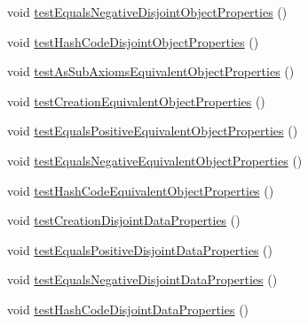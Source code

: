 \begin{DoxyCompactItemize}
\item 
void \hyperlink{classorg_1_1semanticweb_1_1owlapi_1_1datafactory_1_1_o_w_l_data_factory_test_case_a8ba5b1972c721eb5800044b9acf6571a}{test\-Equals\-Negative\-Disjoint\-Object\-Properties} ()
\item 
void \hyperlink{classorg_1_1semanticweb_1_1owlapi_1_1datafactory_1_1_o_w_l_data_factory_test_case_a06f31324ea275c5fe3e97009cce9a9cc}{test\-Hash\-Code\-Disjoint\-Object\-Properties} ()
\item 
void \hyperlink{classorg_1_1semanticweb_1_1owlapi_1_1datafactory_1_1_o_w_l_data_factory_test_case_a3056afa30078644d4db5946d3c4c0cec}{test\-As\-Sub\-Axioms\-Equivalent\-Object\-Properties} ()
\item 
void \hyperlink{classorg_1_1semanticweb_1_1owlapi_1_1datafactory_1_1_o_w_l_data_factory_test_case_a061719b16a6df5a9248bd13da0a093f7}{test\-Creation\-Equivalent\-Object\-Properties} ()
\item 
void \hyperlink{classorg_1_1semanticweb_1_1owlapi_1_1datafactory_1_1_o_w_l_data_factory_test_case_afefba4617e0468ae159b24303c60f43a}{test\-Equals\-Positive\-Equivalent\-Object\-Properties} ()
\item 
void \hyperlink{classorg_1_1semanticweb_1_1owlapi_1_1datafactory_1_1_o_w_l_data_factory_test_case_a05760ee13d75db9ed0c5d97f48e0a853}{test\-Equals\-Negative\-Equivalent\-Object\-Properties} ()
\item 
void \hyperlink{classorg_1_1semanticweb_1_1owlapi_1_1datafactory_1_1_o_w_l_data_factory_test_case_ab879c2a9327b49a7801739518e092564}{test\-Hash\-Code\-Equivalent\-Object\-Properties} ()
\item 
void \hyperlink{classorg_1_1semanticweb_1_1owlapi_1_1datafactory_1_1_o_w_l_data_factory_test_case_a56bae8cbace2a69db99377c0430499b6}{test\-Creation\-Disjoint\-Data\-Properties} ()
\item 
void \hyperlink{classorg_1_1semanticweb_1_1owlapi_1_1datafactory_1_1_o_w_l_data_factory_test_case_a9ff42028dfe4535e917f3d20283aa3bc}{test\-Equals\-Positive\-Disjoint\-Data\-Properties} ()
\item 
void \hyperlink{classorg_1_1semanticweb_1_1owlapi_1_1datafactory_1_1_o_w_l_data_factory_test_case_ad98dbb00ae421c72b2eb1a9a742fca62}{test\-Equals\-Negative\-Disjoint\-Data\-Properties} ()
\item 
void \hyperlink{classorg_1_1semanticweb_1_1owlapi_1_1datafactory_1_1_o_w_l_data_factory_test_case_a8cfac012e276b0ee2eddd24c60760dfc}{test\-Hash\-Code\-Disjoint\-Data\-Properties} ()
\item 

\end{DoxyCompactItemize}
